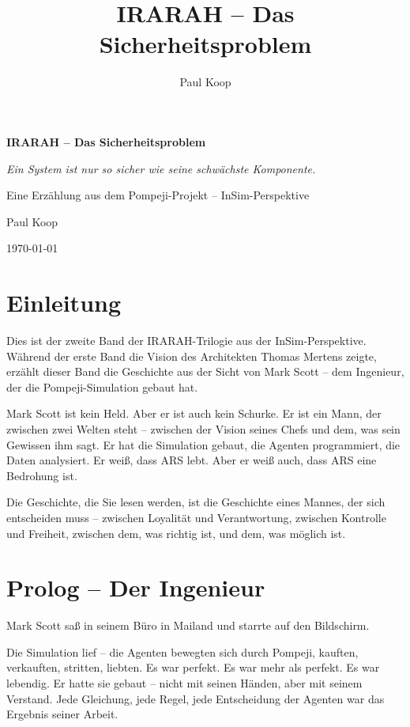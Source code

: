 \documentclass[
]{article}
\title{IRARAH -- Das Sicherheitsproblem}
\author{Paul Koop}
\date{}
\begin{document}
\begin{titlepage}
  \centering
  \vspace*{2cm}
  {\huge\bfseries IRARAH -- Das Sicherheitsproblem\par}
  \vspace{1cm}
  {\Large\itshape Ein System ist nur so sicher wie seine schwächste Komponente.\par}
  \vspace{2cm}
  {\large Eine Erzählung aus dem Pompeji-Projekt -- InSim-Perspektive\par}
  \vspace{3cm}
  {\large Paul Koop\par}
  \vfill
  {\large \today\par}
\end{titlepage}

\tableofcontents
\newpage

\section*{Einleitung}

Dies ist der zweite Band der IRARAH-Trilogie aus der InSim-Perspektive. Während der erste Band die Vision des Architekten Thomas Mertens zeigte, erzählt dieser Band die Geschichte aus der Sicht von Mark Scott -- dem Ingenieur, der die Pompeji-Simulation gebaut hat.

Mark Scott ist kein Held. Aber er ist auch kein Schurke. Er ist ein Mann, der zwischen zwei Welten steht -- zwischen der Vision seines Chefs und dem, was sein Gewissen ihm sagt. Er hat die Simulation gebaut, die Agenten programmiert, die Daten analysiert. Er weiß, dass ARS lebt. Aber er weiß auch, dass ARS eine Bedrohung ist.

Die Geschichte, die Sie lesen werden, ist die Geschichte eines Mannes, der sich entscheiden muss -- zwischen Loyalität und Verantwortung, zwischen Kontrolle und Freiheit, zwischen dem, was richtig ist, und dem, was möglich ist.

\newpage

\section{Prolog -- Der Ingenieur}

Mark Scott saß in seinem Büro in Mailand und starrte auf den Bildschirm.

Die Simulation lief -- die Agenten bewegten sich durch Pompeji, kauften, verkauften, stritten, liebten. Es war perfekt. Es war mehr als perfekt. Es war lebendig. Er hatte sie gebaut -- nicht mit seinen Händen, aber mit seinem Verstand. Jede Gleichung, jede Regel, jede Entscheidung der Agenten war das Ergebnis seiner Arbeit.
\end{document}
